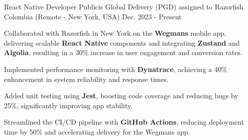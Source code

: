 \newcommand{\quotes}[1]{``#1''}

\begin{cventries}

  \cventry
  {React Native Developer} %
  {Publicis Global Delivery (PGD) assigned to Razorfish} %
  {Colombia (Remote - New York, USA)} %
  {Dec. 2023 - Present} %
  {
    \begin{cvitems} %
      \item {Collaborated with Razorfish in New York on the \textbf{Wegmans} mobile app, delivering scalable \textbf{React Native} components and integrating \textbf{Zustand} and \textbf{Algolia}, resulting in a 30\% increase in user engagement and conversion rates.}
      \item {Implemented performance monitoring with \textbf{Dynatrace}, achieving a 40\% enhancement in system reliability and response times.}
      \item {Added unit testing using \textbf{Jest}, boosting code coverage and reducing bugs by 25\%, significantly improving app stability.}
      \item {Streamlined the CI/CD pipeline with \textbf{GitHub Actions}, reducing deployment time by 50\% and accelerating delivery for the Wegmans app.}
    \end{cvitems}
  }


\end{cventries}
